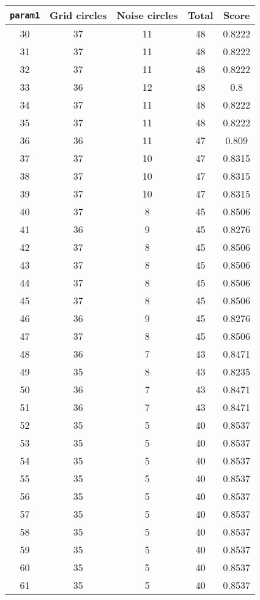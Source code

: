 \documentclass[letterpaper, 12pt]{article}
\begin{document}
\begin{longtable}{|c|c|c|c|c|}
\hline
\textbf{\texttt{param1}} & \textbf{Grid circles} & \textbf{Noise circles} & \textbf{Total} & \textbf{Score} \\
\hline
30 & 37 & 11 & 48 & 0.8222 \\
\hline
31 & 37 & 11 & 48 & 0.8222 \\
\hline
32 & 37 & 11 & 48 & 0.8222 \\
\hline
33 & 36 & 12 & 48 & 0.8 \\
\hline
34 & 37 & 11 & 48 & 0.8222 \\
\hline
35 & 37 & 11 & 48 & 0.8222 \\
\hline
36 & 36 & 11 & 47 & 0.809 \\
\hline
37 & 37 & 10 & 47 & 0.8315 \\
\hline
38 & 37 & 10 & 47 & 0.8315 \\
\hline
39 & 37 & 10 & 47 & 0.8315 \\
\hline
40 & 37 & 8 & 45 & 0.8506 \\
\hline
41 & 36 & 9 & 45 & 0.8276 \\
\hline
42 & 37 & 8 & 45 & 0.8506 \\
\hline
43 & 37 & 8 & 45 & 0.8506 \\
\hline
44 & 37 & 8 & 45 & 0.8506 \\
\hline
45 & 37 & 8 & 45 & 0.8506 \\
\hline
46 & 36 & 9 & 45 & 0.8276 \\
\hline
47 & 37 & 8 & 45 & 0.8506 \\
\hline
48 & 36 & 7 & 43 & 0.8471 \\
\hline
49 & 35 & 8 & 43 & 0.8235 \\
\hline
50 & 36 & 7 & 43 & 0.8471 \\
\hline
51 & 36 & 7 & 43 & 0.8471 \\
\hline
52 & 35 & 5 & 40 & 0.8537 \\
\hline
53 & 35 & 5 & 40 & 0.8537 \\
\hline
54 & 35 & 5 & 40 & 0.8537 \\
\hline
55 & 35 & 5 & 40 & 0.8537 \\
\hline
56 & 35 & 5 & 40 & 0.8537 \\
\hline
57 & 35 & 5 & 40 & 0.8537 \\
\hline
58 & 35 & 5 & 40 & 0.8537 \\
\hline
59 & 35 & 5 & 40 & 0.8537 \\
\hline
60 & 35 & 5 & 40 & 0.8537 \\
\hline
61 & 35 & 5 & 40 & 0.8537 \\

\end{longtable}
\end{document}
